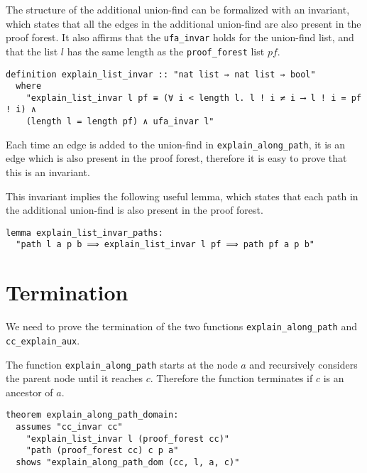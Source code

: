The structure of the additional union-find can be formalized with an invariant, which states that all the edges in the additional union-find are also present in the proof forest. It also affirms that the \lstinline{ufa_invar} holds for the union-find list, and that the list $l$ has the same length as the \lstinline{proof_forest} list $pf$.

\begin{lstlisting}
definition explain_list_invar :: "nat list ⇒ nat list ⇒ bool"
  where
    "explain_list_invar l pf ≡ (∀ i < length l. l ! i ≠ i ⟶ l ! i = pf ! i) ∧
    (length l = length pf) ∧ ufa_invar l"
\end{lstlisting}

Each time an edge is added to the union-find in \lstinline{explain_along_path}, it is an edge which is also present in the proof forest, therefore it is easy to prove that this is an invariant.

This invariant implies the following useful lemma, which states that each path in the additional union-find is also present in the proof forest.

\begin{lstlisting}
lemma explain_list_invar_paths:
  "path l a p b ⟹ explain_list_invar l pf ⟹ path pf a p b"
\end{lstlisting}

\section{Termination}

We need to prove the termination of the two functions \lstinline{explain_along_path} and \lstinline{cc_explain_aux}.

The function \lstinline{explain_along_path} starts at the node $a$ and recursively considers the parent node until it reaches $c$. Therefore the function terminates if $c$ is an ancestor of $a$.

\begin{lstlisting}
theorem explain_along_path_domain:
  assumes "cc_invar cc"
    "explain_list_invar l (proof_forest cc)"
    "path (proof_forest cc) c p a"
  shows "explain_along_path_dom (cc, l, a, c)"
\end{lstlisting}

